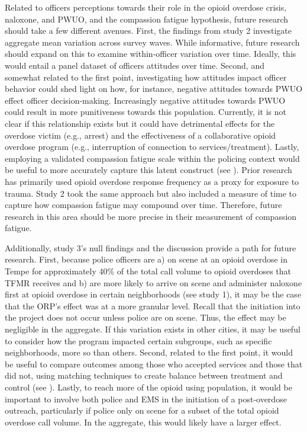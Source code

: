 Related to officers perceptions towards their role in the opioid overdose crisis, naloxone, and PWUO, and the compassion fatigue hypothesis, future research should take a few different avenues. First, the findings from study 2 investigate aggregate mean variation across survey waves. While informative, future research should expand on this to examine within-officer variation over time. Ideally, this would entail a panel dataset of officers attitudes over time. Second, and somewhat related to the first point, investigating how attitudes impact officer behavior could shed light on how, for instance, negative attitudes towards PWUO effect officer decision-making. Increasingly negative attitudes towards PWUO could result in more punitiveness towards this population. Currently, it is not clear if this relationship exists but it could have detrimental effects for the overdose victim (e.g., arrest) and the effectiveness of a collaborative opioid overdose program (e.g., interruption of connection to services/treatment). Lastly, employing a validated compassion fatigue scale within the policing context would be useful to more accurately capture this latent construct (see \cite{adams_compassion_2006}). Prior research has primarily used opioid overdose response frequency as a proxy for exposure to trauma. Study 2 took the same approach but also included a measure of time to capture how compassion fatigue may compound over time. Therefore, future research in this area should be more precise in their measurement of compassion fatigue.

Additionally, study 3's null findings and the discussion provide a path for future research. First, because police officers are a) on scene at an opioid overdose in Tempe for approximately 40\% of the total call volume to opioid overdoses that TFMR receives and b) are more likely to arrive on scene and administer naloxone first at opioid overdose in certain neighborhoods (see study 1), it may be the case that the ORP's effect was at a more granular level. Recall that the initiation into the project does not occur unless police are on scene. Thus, the effect may be negligible in the aggregate. If this variation exists in other cities, it may be useful to consider how the program impacted certain subgroups, such as specific neighborhoods, more so than others. Second, related to the first point, it would be useful to compare outcomes among those who accepted services and those that did not, using matching techniques to create balance between treatment and control (see \cite{perrone_harm_2022}). Lastly, to reach more of the opioid using population, it would be important to involve both police and EMS in the initiation of a post-overdose outreach, particularly if police only on scene for a subset of the total opioid overdose call volume. In the aggregate, this would likely have a larger effect.

